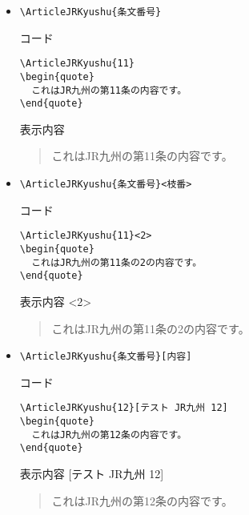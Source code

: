 \documentclass[oneside,10pt,a4paper]{jsarticle}
\begin{document}
  \begin{itemize}
    \item \verb|\ArticleJRKyushu{条文番号}|
      \begin{itembox}[l]{コード}
        {\footnotesize\begin{verbatim}
\ArticleJRKyushu{11}
\begin{quote}
  これはJR九州の第11条の内容です。
\end{quote}\end{verbatim}}
      \end{itembox}
      \begin{itembox}[l]{表示内容}
        \begin{quote}
          これはJR九州の第11条の内容です。
        \end{quote}
      \end{itembox}
    \item \verb|\ArticleJRKyushu{条文番号}<枝番>|
      \begin{itembox}[l]{コード}
        {\footnotesize\begin{verbatim}
\ArticleJRKyushu{11}<2>
\begin{quote}
  これはJR九州の第11条の2の内容です。
\end{quote}\end{verbatim}}
      \end{itembox}
      \begin{itembox}[l]{表示内容}
        <2>
        \begin{quote}
          これはJR九州の第11条の2の内容です。
        \end{quote}
      \end{itembox}
    \newpage
    \item \verb|\ArticleJRKyushu{条文番号}[内容]|
      \begin{itembox}[l]{コード}
        {\footnotesize\begin{verbatim}
\ArticleJRKyushu{12}[テスト JR九州 12]
\begin{quote}
  これはJR九州の第12条の内容です。
\end{quote}\end{verbatim}}
      \end{itembox}
      \begin{itembox}[l]{表示内容}
        [テスト JR九州 12]
        \begin{quote}
          これはJR九州の第12条の内容です。
        \end{quote}
      \end{itembox}

\end{itemize}
\end{document}
